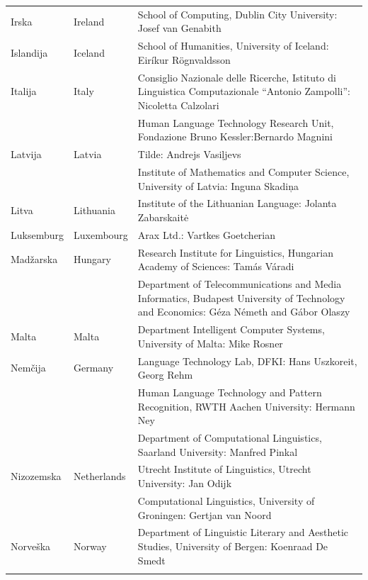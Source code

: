 \begin{longtable}{@{}llp{113mm}@{}}
  Irska & \textcolor{grey1}{Ireland} & School of Computing, Dublin City University: Josef van Genabith\\ \addlinespace
  Islandija & \textcolor{grey1}{Iceland} & School of Humanities, University of Iceland: Eiríkur Rögnvaldsson\\ \addlinespace
  Italija & \textcolor{grey1}{Italy} & Consiglio Nazionale delle Ricerche, Istituto di Linguistica Computazionale “Antonio Zampolli”: Nicoletta Calzolari\\ \addlinespace
  & & Human Language Technology Research Unit, Fondazione Bruno Kessler:\newline Bernardo Magnini\\ \addlinespace
  Latvija & \textcolor{grey1}{Latvia} & Tilde: Andrejs Vasiļjevs\\ \addlinespace 
  & & Institute of Mathematics and Computer Science, University of Latvia: Inguna Skadiņa\\ \addlinespace
  Litva & \textcolor{grey1}{Lithuania} & Institute of the Lithuanian Language: Jolanta Zabarskaitė\\ \addlinespace
  Luksemburg & \textcolor{grey1}{Luxembourg} & Arax Ltd.: Vartkes Goetcherian\\ \addlinespace
  Madžarska & \textcolor{grey1}{Hungary} & Research Institute for Linguistics, Hungarian Academy of Sciences: Tamás Váradi\\  \addlinespace
  & & Department of Telecommunications and Media Informatics, Budapest University of Technology and Economics: Géza Németh and Gábor Olaszy\\ \addlinespace
  Malta & \textcolor{grey1}{Malta} & Department Intelligent Computer Systems, University of Malta: Mike Rosner\\ \addlinespace
  Nemčija & \textcolor{grey1}{Germany} & Language Technology Lab, DFKI: Hans Uszkoreit, Georg Rehm\\ \addlinespace
  & & Human Language Technology and Pattern Recognition, RWTH Aachen University: Hermann Ney \\ \addlinespace
  & & Department of Computational Linguistics, Saarland University: Manfred Pinkal\\ \addlinespace 
  Nizozemska & \textcolor{grey1}{Netherlands} & Utrecht Institute of Linguistics, Utrecht University: Jan Odijk\\ \addlinespace 
  & & Computational Linguistics, University of Groningen: Gertjan van Noord\\ \addlinespace
  Norveška & \textcolor{grey1}{Norway} & Department of Linguistic Literary and Aesthetic Studies, University of Bergen: Koenraad De Smedt\\ \addlinespace 

\end{longtable}
